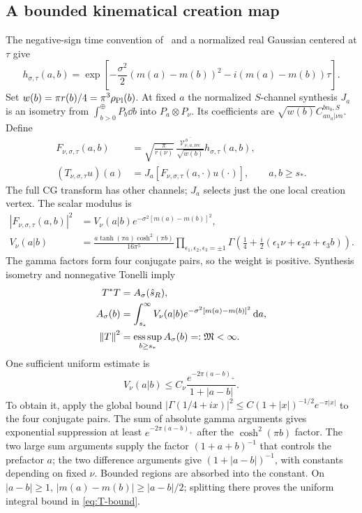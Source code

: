 \subsection{A bounded kinematical creation map}
The negative-sign time convention of~\cite{KL} and a normalized real
Gaussian centered at $\tau$ give
\begin{equation}
 h_{\sigma,\tau}(a,b)
 =\exp\!\left[-\frac{\sigma^2}{2}(m(a)-m(b))^2
               -i(m(a)-m(b))\tau\right].
 \label{eq:gaussian-time}
\end{equation}
Set $w(b)=\pi r(b)/4=\pi^3\rho_{\mathrm{Pl}}(b)$. At fixed $a$ the normalized
$S$-channel synthesis $J_a$ is an isometry from
$\int^\oplus_{b>0}P_b\dd b$ into $P_a\otimes P_\nu$.
Its coefficients are $\sqrt{w(b)}C^{b n_b,S}_{a n_a|\nu n}$.
Define
\begin{align}
 F_{\nu,\sigma,\tau}(a,b)
 &=\sqrt{\frac{\pi}{r(\nu)}}\,
 \frac{\overline{\mathcal V^{\,b}_{\nu,a,\mathrm{rec}}}}{\sqrt{w(b)}}
 h_{\sigma,\tau}(a,b),\label{eq:scalar-creation}\\
 (T_{\nu,\sigma,\tau}u)(a)
 &=J_a[F_{\nu,\sigma,\tau}(a,\cdot)u(\cdot)],\qquad a,b\ge s_*.
\end{align}
The full CG transform has other channels; $J_a$ selects just the one
local creation vertex. The scalar modulus is
\begin{align}
 |F_{\nu,\sigma,\tau}(a,b)|^2
 &=V_\nu(a|b)e^{-\sigma^2[m(a)-m(b)]^2},\\
 V_\nu(a|b)&=\frac{a\tanh(\pi a)\cosh^2(\pi b)}{16\pi^5}
 \prod_{\epsilon_1,\epsilon_2,\epsilon_3=\pm1}
 \Gamma\!\left(\frac14+
  \frac i2(\epsilon_1\nu+\epsilon_2a+\epsilon_3b)\right).
 \label{eq:positive-kernel}
\end{align}
The gamma factors form four conjugate pairs, so the weight is positive.
Synthesis isometry and nonnegative Tonelli imply
\begin{align}
 T^*T&=A_\sigma(\hat s_R),\\
 A_\sigma(b)&=\int_{s_*}^\infty
       V_\nu(a|b)e^{-\sigma^2[m(a)-m(b)]^2}\mathop{}\!\mathrm d a,\notag\\
 \left\lVert T\right\rVert^2&=\operatorname*{ess\,sup}_{b\ge s_*}A_\sigma(b)=:\mathfrak M<\infty.
 \label{eq:T-bound}
\end{align}
One sufficient uniform estimate is
\begin{equation}
 V_\nu(a|b)\le C_\nu
 \frac{e^{-2\pi(a-b)_+}}{1+|a-b|}.
 \label{eq:gamma-envelope}
\end{equation}
To obtain it, apply the global bound
$|\Gamma(1/4+ix)|^2\le C(1+|x|)^{-1/2}e^{-\pi|x|}$
to the four conjugate pairs. The sum of absolute gamma arguments gives
exponential suppression at least $e^{-2\pi(a-b)_+}$ after the
$\cosh^2(\pi b)$ factor. The two large sum arguments supply the factor
$(1+a+b)^{-1}$ that controls the prefactor $a$; the two difference
arguments give $(1+|a-b|)^{-1}$, with constants depending on fixed $\nu$.
Bounded regions are absorbed into the constant. On $|a-b|\ge1$,
$|m(a)-m(b)|\ge|a-b|/2$; splitting there proves the uniform integral
bound in \eqref{eq:T-bound}.


